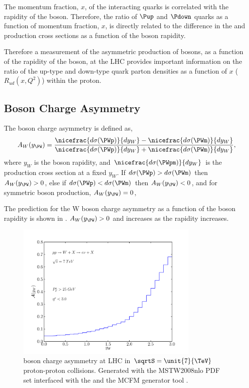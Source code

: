 The momentum fraction, $x$, of the interacting quarks is correlated with the
rapidity of the \PW boson. Therefore, the ratio of $\Pup$ and $\Pdown$ quarks as
a function of momentum fraction, $x$, is directly related to the difference in
the \PWp and \PWm production cross sections as a function of the boson rapidity.

Therefore a measurement of the asymmetric production of \PW bosons, as a
function of the rapidity of the boson, at the {LHC} provides important
information on the ratio of the up-type and down-type quark parton densities as
a function of $x$ ($R_{ud}(x,Q^2)$) within the proton\cite{kom}. 

\subsection{\PW Boson Charge Asymmetry}

The \PWpm boson charge asymmetry is defined as,
\begin{equation}
  A_{W}(y_{\PW})=
    \frac{ 
      \nicefrac{ d\sigma (\PWp) }{ dy_{W} } -
      \nicefrac{ d\sigma (\PWm) }{ dy_{W} }
    }
    {
      \nicefrac{ d\sigma (\PWp) }{ dy_{W} } +
      \nicefrac{ d\sigma (\PWm) }{ dy_{W} }
    }
,
\label{wbos:wasym}
\end{equation} 
where $y_{W}$ is the boson rapidity, and 
$\nicefrac{ d\sigma (\PWpm) }{ dy_{W} }$ is the \PWpm production cross section
at a fixed $y_{W}$.  
If $d\sigma(\PWp) > d\sigma(\PWm) $ then $A_{W}(y_{\PW})> 0$,
else if $d\sigma(\PWp) < d\sigma(\PWm) $ then $A_{W}(y_{\PW})< 0$,
and for symmetric \PWpm boson production, $A_{W}(y_{\PW})= 0$,

The prediction for the W boson charge asymmetry as a function of the boson
rapidity is shown in . $A_{W}(y_{\PW})> 0$ and
increases as the rapidity increases.

\begin{figure}[htbp]
  \centering
  \includegraphics[width=0.8\textwidth]{w-asym}
  \caption[\PW boson charge asymmetry at LHC in ${\sqrtS=\unit{7}{\TeV}}$
proton-proton collisions.] {\PW boson charge asymmetry at LHC in
$\sqrtS=\unit{7}{\TeV}$ proton-proton collisions.  Generated with the
MSTW2008nlo PDF set\cite{martin2009parton} interfaced with the and the MCFM
generator tool \cite{campbellmcfm}.}
  \label{wbos:chargeasym}
\end{figure}

